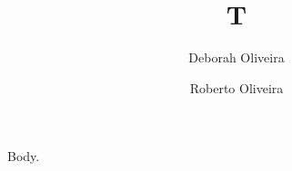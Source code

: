 \documentclass{amsart}
\begin{document}
\title{T}
\author{Deborah Oliveira}
\address{IMPA, Rio}
\author{Roberto Oliveira}
\address{IMPA, Rio}
\maketitle
Body.
\end{document}
